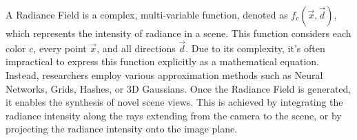 A Radiance Field is a complex, 
multi-variable function, denoted as $f_c(\vec{x},\vec{d})$, 
which represents the intensity of radiance in a scene. 
This function considers each color $c$, 
every point $\vec{x}$, and all directions $\vec{d}$. 
Due to its complexity, it's often impractical to 
express this function explicitly as a mathematical equation. 
Instead, researchers employ various approximation methods 
such as Neural Networks, Grids, Hashes, or 3D Gaussians. 
Once the Radiance Field is generated, it enables the synthesis of novel scene views. 
This is achieved by integrating the radiance intensity along the rays extending from the camera to the scene, 
or by projecting the radiance intensity onto the image plane.